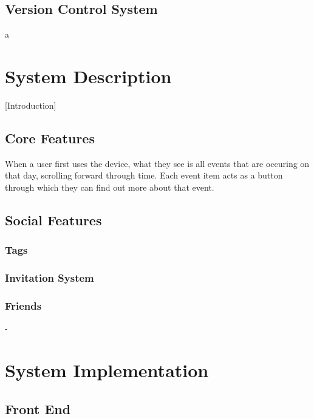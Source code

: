\documentclass[11pt]{article}
\begin{document}
\subsection {Version Control System}
a
\section {System Description}

[Introduction]
\subsection {Core Features}

When a user first uses the device, what they see is all events that are occuring on that day, scrolling forward through time. Each event item acts as a button through which they can find out more about that event.



\subsection {Social Features}
\subsubsection{Tags}
\subsubsection{Invitation System}
\subsubsection{Friends}



-



\section {System Implementation}
\subsection {Front End}
\end{document}
